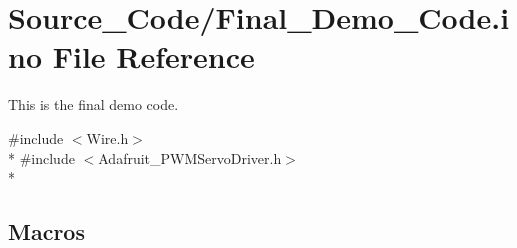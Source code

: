 \hypertarget{_final___demo___code_8ino}{\section{Source\-\_\-\-Code/\-Final\-\_\-\-Demo\-\_\-\-Code.ino File Reference}
\label{_final___demo___code_8ino}
}


This is the final demo code.  


{\ttfamily \#include $<$Wire.\-h$>$}\\*
{\ttfamily \#include $<$Adafruit\-\_\-\-P\-W\-M\-Servo\-Driver.\-h$>$}\\*
\subsection*{Macros}

